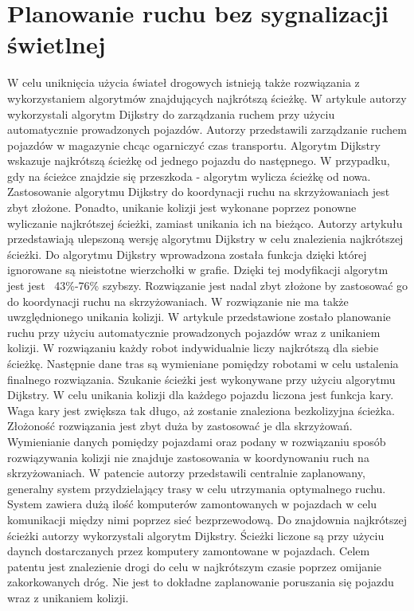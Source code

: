 \section{Planowanie ruchu bez sygnalizacji świetlnej}

W celu uniknięcia użycia świateł drogowych istnieją także rozwiązania z wykorzystaniem algorytmów znajdujących najkrótszą ścieżkę. W artykule \cite{shaikh2013agv} autorzy wykorzystali algorytm Dijkstry do zarządzania ruchem przy użyciu automatycznie prowadzonych pojazdów. Autorzy przedstawili zarządzanie ruchem pojazdów w magazynie chcąc ogarniczyć czas transportu. Algorytm Dijkstry wskazuje najkrótszą ścieżkę od jednego pojazdu do następnego. W przypadku, gdy na ścieżce znajdzie się przeszkoda - algorytm wylicza ścieżkę od nowa. Zastosowanie algorytmu Dijkstry do koordynacji ruchu na skrzyżowaniach jest zbyt złożone. Ponadto, unikanie kolizji jest wykonane poprzez ponowne wyliczanie najkrótszej ścieżki, zamiast unikania ich na bieżąco.
\newline
\indent
Autorzy artykułu \cite{huang2013improved} przedstawiają ulepszoną wersję algorytmu Dijkstry w celu znalezienia najkrótszej ścieżki. Do algorytmu Dijkstry wprowadzona została funkcja dzięki której ignorowane są nieistotne wierzchołki w grafie. Dzięki tej modyfikacji algorytm jest jest ~43\%-76\% szybszy. Rozwiązanie jest nadal zbyt złożone by zastosować go do koordynacji ruchu na skrzyżowaniach. W rozwiązanie nie ma także uwzględnionego unikania kolizji.
\newline
\indent
W artykule \cite{ando2003autonomous} przedstawione zostało planowanie ruchu przy użyciu automatycznie prowadzonych pojazdów wraz z unikaniem kolizji. W rozwiązaniu każdy robot indywidualnie liczy najkrótszą dla siebie ścieżkę. Następnie dane tras są wymieniane pomiędzy robotami w celu ustalenia finalnego rozwiązania. Szukanie ścieżki jest wykonywane przy użyciu algorytmu Dijkstry. W celu unikania kolizji dla każdego pojazdu liczona jest funkcja kary. Waga kary jest zwiększa tak długo, aż zostanie znaleziona bezkolizyjna ścieżka. Złożoność rozwiązania jest zbyt duża by zastosować je dla skrzyżowań. Wymienianie danych pomiędzy pojazdami oraz podany w rozwiązaniu sposób rozwiązywania kolizji nie znajduje zastosowania w koordynowaniu ruch na skrzyżowaniach.
\newline
\indent
W patencie \cite{gazis1997optimal} autorzy przedstawili centralnie zaplanowany, generalny system przydzielający trasy w celu utrzymania optymalnego ruchu. System zawiera dużą ilość komputerów zamontowanych w pojazdach w celu komunikacji między nimi poprzez sieć bezprzewodową. Do znajdownia najkrótszej ścieżki autorzy wykorzystali algorytm Dijkstry. Ścieżki liczone są przy użyciu daynch dostarczanych przez komputery zamontowane w pojazdach. Celem patentu jest znalezienie drogi do celu w najkrótszym czasie poprzez omijanie zakorkowanych dróg. Nie jest to dokładne zaplanowanie poruszania się pojazdu wraz z unikaniem kolizji.
